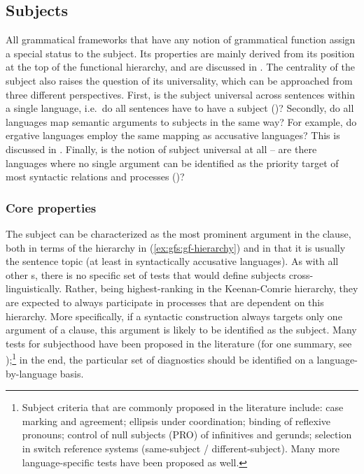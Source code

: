 \documentclass[output=paper]{../langscibook}
\begin{document}
 \subsection{Subjects\label{sect:gfs:subj}}
 All grammatical frameworks that have any notion of grammatical function assign a special status to the subject. Its properties are mainly derived from its position at the top of the functional hierarchy, and are discussed in . The centrality of the subject also raises the question of its universality, which can be approached from three different perspectives. First, is the subject universal across sentences within a single language, i.e.\ do all sentences have to have a subject ()? Secondly, do all languages map semantic arguments to subjects in the same way? For example, do ergative languages employ the same mapping as accusative languages? This is discussed in . Finally, is the notion of subject universal at all -- are there languages where no single argument can be identified as the priority target of most syntactic relations and processes ()?

 \subsubsection{Core properties\label{sect:gfs:subj-core}}
 \largerpage
 The subject can be characterized as the most prominent argument in the clause, both in terms of the hierarchy in (\ref{ex:gfs:gf-hierarchy}) and in that it is usually the sentence topic (at least in syntactically accusative languages). As with all other {\GF}s, there is no specific set of tests that would define subjects cross-linguistically. Rather, being highest-ranking in the Keenan-Comrie hierarchy, they are expected to always participate in processes that are dependent on this hierarchy. More specifically, if a syntactic construction always targets only one argument of a clause, this argument is likely to be identified as the subject. Many tests for subjecthood have been proposed in the literature (for one summary, see \citealt{andrews2007-np});\footnote{Subject criteria that are commonly proposed in the literature include: case marking and agreement; ellipsis under coordination; binding of reflexive pronouns; control of null subjects (PRO) of infinitives and gerunds; selection in switch reference systems (same-subject / different-subject). Many more language-specific tests have been proposed as well.} in the end, the particular set of diagnostics should be identified on a language-by-language basis.
 
\end{document}

